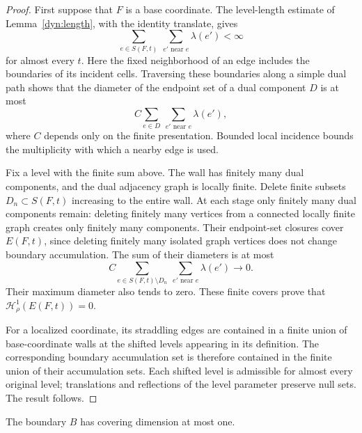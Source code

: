 \begin{proof}
First suppose that $F$ is a base coordinate.  The level-length estimate
of Lemma~\ref{dyn:length}, with the identity translate, gives
\[
 \sum_{e\in S(F,t)}\ \sum_{e'\text{ near }e}\lambda(e')<\infty
\]
for almost every $t$.  Here the fixed neighborhood of an edge includes
the boundaries of its incident cells.  Traversing these boundaries along
a simple dual path shows that the diameter of the endpoint set of a dual
component $D$ is at most
\[
 C\sum_{e\in D}\ \sum_{e'\text{ near }e}\lambda(e'),
\]
where $C$ depends only on the finite presentation.  Bounded local
incidence bounds the multiplicity with which a nearby edge is used.

Fix a level with the finite sum above.  The wall has finitely many dual
components, and the dual adjacency graph is locally finite.  Delete
finite subsets $D_n\subset S(F,t)$ increasing to the entire wall.  At
each stage only finitely many dual components remain: deleting finitely
many vertices from a connected locally finite graph creates only finitely
many components.  Their endpoint-set closures cover $E(F,t)$, since
deleting finitely many isolated graph vertices does not change boundary
accumulation.  The sum of their diameters is at most
\[
 C\sum_{e\in S(F,t)\setminus D_n}
       \ \sum_{e'\text{ near }e}\lambda(e')\longrightarrow0.
\]
Their maximum diameter also tends to zero.  These finite covers prove
that $\mathcal H^1_\rho(E(F,t))=0$.

For a localized coordinate, its straddling edges are contained in a
finite union of base-coordinate walls at the shifted levels appearing
in its definition.  The corresponding boundary accumulation set is
therefore contained in the finite union of their accumulation sets.
Each shifted level is admissible for almost every original level;
translations and reflections of the level parameter preserve null sets.
The result follows.
\end{proof}

\begin{proposition}\label{topo:dimension}
The boundary $B$ has covering dimension at most one.
\end{proposition}

